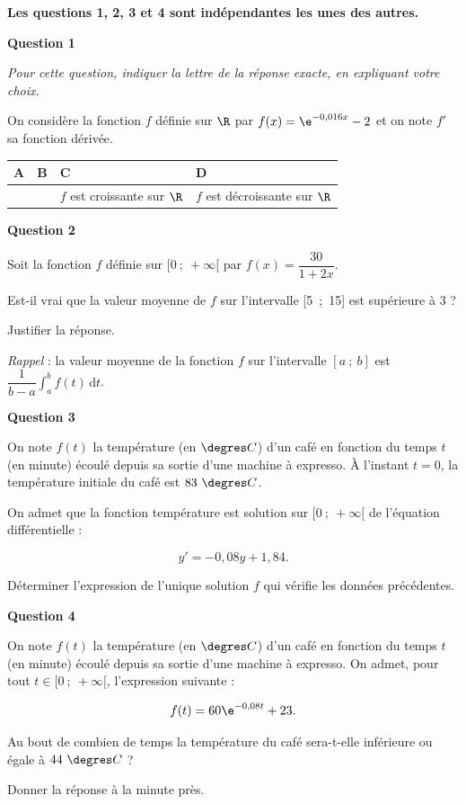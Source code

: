\medskip

\textbf{Les questions 1, 2, 3 et 4 sont indépendantes les unes des autres.}

\medskip

\textbf{Question 1}

\medskip

\textit{Pour cette question, indiquer la lettre de la réponse exacte, en expliquant votre choix.}

On considère la fonction $f$ définie sur $\R$ par 
$f(x) = \e^{- 0,016x} - 2$
et on note $f'$ sa fonction dérivée.

\begin{center}
\begin{tabularx}{\linewidth}{|*{4}{>{\centering \arraybackslash}X|}}\hline
A&B&C&D\\ \hline
\raisebox{-2mm}{$f(0) = - 2$} & 
\raisebox{-2mm}{$f'(x) = \e^{-0,016x}$} & 
$f$ est croissante sur $\R$ & 
$f$ est décroissante sur $\R$\\ \hline
\end{tabularx}
\end{center}

\bigskip

\textbf{Question 2}

\medskip

Soit la fonction $f$ définie sur $[0~;~+ \infty[$ par 
$f(x) = \dfrac{30}{1 + 2x}$.

Est-il vrai que la valeur moyenne de $f$ sur l'intervalle [5~;~15] est supérieure à 3 ?

Justifier la réponse.

\textit{Rappel} : la valeur moyenne de la fonction $f$ sur l'intervalle $[a~;~b]$ est $\displaystyle\dfrac{1}{b - a}\int_a^b f(t)\,\text{d}t$.

\bigskip

\textbf{Question 3}

\medskip

On note $f(t)$ la température (en $\degres C$) d'un café en fonction du temps $t$ (en minute) écoulé depuis sa sortie d'une machine à expresso. À l'instant $t = 0$, la température initiale du café est $83~\degres C$.

On admet que la fonction température est solution sur $[0~;~ +\infty[$ de l'équation différentielle :

\[y' = - 0,08y + 1,84.\]

Déterminer l'expression de l'unique solution $f$ qui vérifie les données précédentes.

\bigskip

\textbf{Question 4}

\medskip

On note $f(t)$ la température (en $\degres C$) d'un café en fonction du temps $t$ (en minute) écoulé depuis sa sortie d'une machine à expresso. On admet, pour tout $t \in [0~;~ +\infty[$, l'expression suivante :

\[f(t) = 60\e^{- 0,08t} + 23.\]

Au bout de combien de temps la température du café sera-t-elle inférieure ou égale à $44~\degres C$ ?

Donner la réponse à la minute près.

\bigskip
